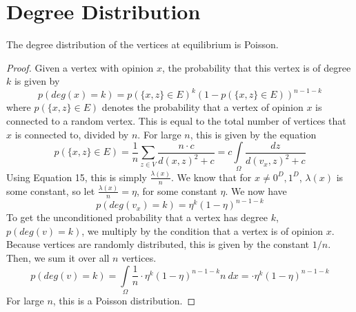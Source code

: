 \documentclass[a4paper,10pt]{article}
\begin{document}
\section{Degree Distribution}
The degree distribution of the vertices at equilibrium is Poisson.
\begin{proof}
Given a vertex with opinion $x$, the probability that this vertex is of degree $k$ is given by
	\begin{equation}
		p\left(deg(x)=k\right) = p(\{x, z\} \in E)^k (1 - p(\{x, z\} \in E))^{n-1-k}
	\end{equation}
where $p(\{x, z\} \in E)$ denotes the probability that a vertex of opinion $x$ is connected to a random vertex. This is equal to the total number of vertices that $x$ is connected to, divided by $n$. For large $n$, this is given by the equation
	\begin{equation}
		p(\{x, z\} \in E) = \frac{1}{n} \sum_{z \in V} \frac{n \cdot c}{d(x, z)^2 + c} = c \int\limits_\Omega \frac{dz}{d(v_x, z)^2 + c}
	\end{equation}
Using Equation 15, this is simply $\frac{\lambda(x)}{n}$. We know that for $x \ne 0^D, 1^D$, $\lambda(x)$ is some constant, so let $\frac{\lambda(x)}{n} = \eta$, for some constant $\eta$. We now have
	\begin{equation}
		p\left(deg(v_x)=k\right) = \eta ^k \left( 1 - \eta \right)^{n-1-k}
	\end{equation}
To get the unconditioned probability that a vertex has degree $k$, $p\left(deg(v)=k\right)$, we multiply by the condition that a vertex is of opinion $x$. Because vertices are randomly distributed, this is given by the constant $1/n$. Then, we sum it over all $n$ vertices.
	\begin{equation}
		p\left(deg(v)=k\right) =  \int\limits_\Omega \frac{1}{n} \cdot \eta ^k \left( 1 - \eta \right)^{n-1-k} n \ dx = \cdot \eta ^k \left( 1 - \eta \right)^{n-1-k}
	\end{equation}
	For large $n$, this is a Poisson distribution.
\end{proof}
\end{document}
